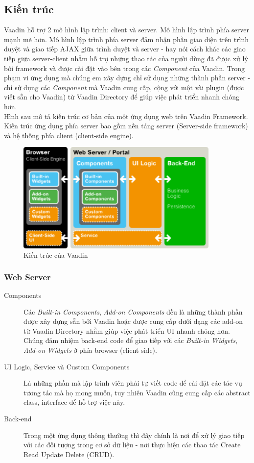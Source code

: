 \subsection{Kiến trúc}
Vaadin hỗ trợ 2 mô hình lập trình: client và server. Mô hình lập trình phía server mạnh mẽ hơn. Mô hình lập trình phía server đảm nhận phần giao diện trên trình duyệt và giao tiếp AJAX giữa trình duyệt và server - hay nói cách khác các giao tiếp giữa server-client nhằm hỗ trợ những thao tác của người dùng đã được xử lý bởi framework và được cài đặt vào bên trong các \textit{Component} của Vaadin. Trong phạm vi ứng dụng mà chúng em xây dựng chỉ sử dụng những thành phần server - chỉ sử dụng các \textit{Component} mà Vaadin cung cấp, cộng với một vài plugin (được viết sẵn cho Vaadin) từ Vaadin Directory \cite{vaadindirectory} để giúp việc phát triển nhanh chóng hơn. 
\\
Hình sau mô tả kiến trúc cơ bản của một ứng dụng web trên Vaadin Framework. Kiến trúc ứng dụng phía server bao gồm nền tảng server (Server-side framework) và hệ thống phía client (client-side engine). 
\begin{figure}[ht!]
	\centering
	\includegraphics[width=100mm]{Figures/vaadin_architecture0.png}
	\caption{Kiến trúc của Vaadin\label{overflow}}
\end{figure}

\subsubsection{Web Server}
\begin{description}
\item[Components] Các \textit{Built-in Components}, \textit{Add-on Components} đều là những thành phần được xây dựng sẵn bởi Vaadin  hoặc được cung cấp dưới dạng các add-on từ Vaadin Directory \cite{vaadindirectory} nhằm giúp việc phát triển UI nhanh chóng hơn. Chúng đảm nhiệm back-end code để giao tiếp với các \textit{Built-in Widgets}, \textit{Add-on Widgets} ở phía browser (client side).
\item[UI Logic, Service và Custom Components] Là những phần mà lập trình viên phải tự viết code để cài đặt các tác vụ tương tác mà họ mong muốn, tuy nhiên Vaadin cũng cung cấp các abstract class, interface để hỗ trợ việc này. 
\item[Back-end] Trong một ứng dụng thông thường thì đây chính là nơi để xử lý giao tiếp với các đối tượng trong cơ sở dữ liệu - nơi thực hiện các thao tác Create
Read Update Delete (CRUD).
\end{description}
